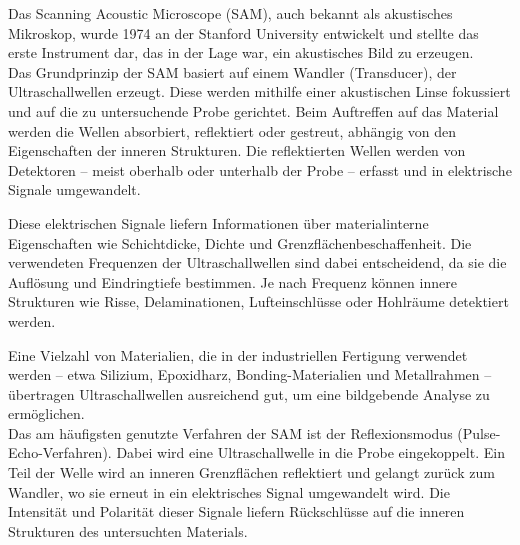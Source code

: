 Das Scanning Acoustic Microscope (SAM), auch bekannt als akustisches Mikroskop, wurde 1974 an der Stanford University entwickelt und stellte das erste Instrument dar, das in der Lage war, ein akustisches Bild zu erzeugen.\\

Das Grundprinzip der SAM basiert auf einem Wandler (Transducer), der Ultraschallwellen erzeugt. Diese werden mithilfe einer akustischen Linse fokussiert und auf die zu untersuchende Probe gerichtet. Beim Auftreffen auf das Material werden die Wellen absorbiert, reflektiert oder gestreut, abhängig von den Eigenschaften der inneren Strukturen. Die reflektierten Wellen werden von Detektoren – meist oberhalb oder unterhalb der Probe – erfasst und in elektrische Signale umgewandelt.

Diese elektrischen Signale liefern Informationen über materialinterne Eigenschaften wie Schichtdicke, Dichte und Grenzflächenbeschaffenheit. Die verwendeten Frequenzen der Ultraschallwellen sind dabei entscheidend, da sie die Auflösung und Eindringtiefe bestimmen. Je nach Frequenz können innere Strukturen wie Risse, Delaminationen, Lufteinschlüsse oder Hohlräume detektiert werden.

Eine Vielzahl von Materialien, die in der industriellen Fertigung verwendet werden – etwa Silizium, Epoxidharz, Bonding-Materialien und Metallrahmen – übertragen Ultraschallwellen ausreichend gut, um eine bildgebende Analyse zu ermöglichen.\\

Das am häufigsten genutzte Verfahren der SAM ist der Reflexionsmodus (Pulse-Echo-Verfahren). Dabei wird eine Ultraschallwelle in die Probe eingekoppelt. Ein Teil der Welle wird an inneren Grenzflächen reflektiert und gelangt zurück zum Wandler, wo sie erneut in ein elektrisches Signal umgewandelt wird. Die Intensität und Polarität dieser Signale liefern Rückschlüsse auf die inneren Strukturen des untersuchten Materials.
\\




